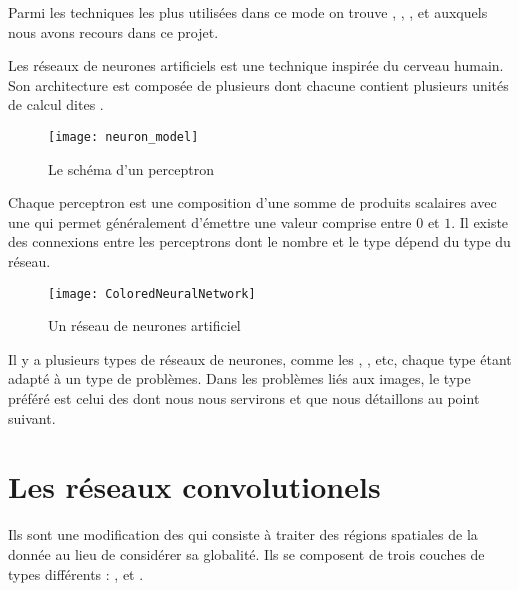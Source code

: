 Parmi les techniques les plus utilisées dans ce mode on trouve
, ,
,
 et
 auxquels nous avons recours dans
ce projet.

Les réseaux de neurones artificiels est une technique inspirée du cerveau humain.
Son architecture est composée de plusieurs  dont chacune
contient plusieurs unités de calcul dites .

\begin{figure}[H]
\begin{center}
\texttt{[image: neuron\_model]}
\caption{Le schéma d'un perceptron}{\cite{karpathy2016cs231n}}
\end{center}
\end{figure}

Chaque perceptron est une composition d'une somme de
produits scalaires avec une  qui permet
généralement d'émettre une valeur comprise entre $0$ et $1$.
Il existe des connexions entre les perceptrons dont le nombre et le type dépend
du type du réseau.

\begin{figure}[H]
\begin{center}
\texttt{[image: ColoredNeuralNetwork]}
\caption{Un réseau de neurones artificiel}{\cite{commonsANN}}
\end{center}
\end{figure}

Il y a plusieurs types de réseaux de neurones, comme
les , , etc,
chaque type étant adapté à un type de problèmes.
Dans les problèmes liés aux images, le type préféré est celui des
 dont nous nous servirons et que nous détaillons
au point suivant.

\section{Les réseaux convolutionels}

Ils sont une modification des  qui consiste à
traiter des régions spatiales de la donnée au lieu de considérer sa globalité.
Ils se composent de trois couches de types différents :
,
 et
.

